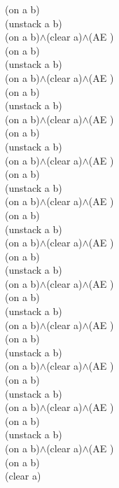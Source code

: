 {{(on a b)\\
(unstack a b)\\
(on a b)$\wedge$(clear a)$\wedge$(AE )\\
(on a b)\\
(unstack a b)\\
(on a b)$\wedge$(clear a)$\wedge$(AE )\\
(on a b)\\
(unstack a b)\\
(on a b)$\wedge$(clear a)$\wedge$(AE )\\
(on a b)\\
(unstack a b)\\
(on a b)$\wedge$(clear a)$\wedge$(AE )\\
(on a b)\\
(unstack a b)\\
(on a b)$\wedge$(clear a)$\wedge$(AE )\\
(on a b)\\
(unstack a b)\\
(on a b)$\wedge$(clear a)$\wedge$(AE )\\
(on a b)\\
(unstack a b)\\
(on a b)$\wedge$(clear a)$\wedge$(AE )\\
(on a b)\\
(unstack a b)\\
(on a b)$\wedge$(clear a)$\wedge$(AE )\\
(on a b)\\
(unstack a b)\\
(on a b)$\wedge$(clear a)$\wedge$(AE )\\
(on a b)\\
(unstack a b)\\
(on a b)$\wedge$(clear a)$\wedge$(AE )\\
(on a b)\\
(unstack a b)\\
(on a b)$\wedge$(clear a)$\wedge$(AE )\\
(on a b)\\
(clear a)\\
}%
}

